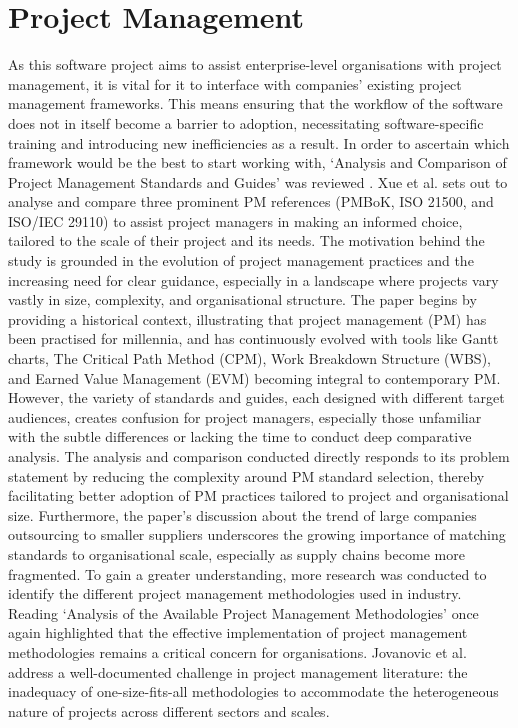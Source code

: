 \documentclass{report}
\begin{document}
\section{Project Management}
As this software project aims to assist enterprise-level organisations with project management, it is vital for it to interface with companies’ existing project management frameworks. This means ensuring that the workflow of the software does not in itself become a barrier to adoption, necessitating software-specific training and introducing new inefficiencies as a result.
In order to ascertain which framework would be the best to start working with, ‘Analysis and Comparison of Project Management Standards and Guides’ was reviewed \parencite{xueAnalysisComparisonProject}. Xue et al. sets out to analyse and compare three prominent PM references (PMBoK, ISO 21500, and ISO/IEC 29110) to assist project managers in making an informed choice, tailored to the scale of their project and its needs.
The motivation behind the study is grounded in the evolution of project management practices and the increasing need for clear guidance, especially in a landscape where projects vary vastly in size, complexity, and organisational structure. The paper begins by providing a historical context, illustrating that project management (PM) has been practised for millennia, and has continuously evolved with tools like Gantt charts, The Critical Path Method (CPM), Work Breakdown Structure (WBS), and Earned Value Management (EVM) becoming integral to contemporary PM. However, the variety of standards and guides, each designed with different target audiences, creates confusion for project managers, especially those unfamiliar with the subtle differences or lacking the time to conduct deep comparative analysis.
The analysis and comparison conducted directly responds to its problem statement by reducing the complexity around PM standard selection, thereby facilitating better adoption of PM practices tailored to project and organisational size. Furthermore, the paper’s discussion about the trend of large companies outsourcing to smaller suppliers underscores the growing importance of matching standards to organisational scale, especially as supply chains become more fragmented.
To gain a greater understanding, more research was conducted to identify the different project management methodologies used in industry. Reading ‘Analysis of the Available Project Management Methodologies’ \parencite{jovanovicAnalysisAvailableProject2018} once again highlighted that the effective implementation of project management methodologies remains a critical concern for organisations. Jovanovic et al. address a well-documented challenge in project management literature: the inadequacy of one-size-fits-all methodologies to accommodate the heterogeneous nature of projects across different sectors and scales.
\end{document}
